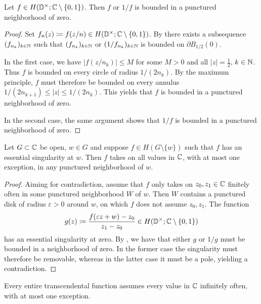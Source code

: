 \begin{lemma} \label{lem:great-picard-bounded}
    Let $f \in H(\mathbb{D}^\times; \mathbb{C} \setminus \{ 0, 1 \})$. Then $f$ or $1/f$ is bounded in a punctured neighborhood of zero.
\end{lemma}

\begin{proof}
    Set $f_n(z) \coloneqq f(z / n) \in H(\mathbb{D}^\times; \mathbb{C} \setminus \{ 0, 1 \})$. By  there exists a subsequence $(f_{n_k})_{k \in \mathbb{N}}$ such that $(f_{n_k})_{k \in \mathbb{N}}$ or $(1 / f_{n_k})_{k \in \mathbb{N}}$ is bounded on $\partial B_{1/2}(0)$.

    In the first case, we have $\vert f(z / n_k) \vert \leq M$ for some $M > 0$ and all $\vert z \vert = \frac{1}{2}$, $k \in \mathbb{N}$. Thus $f$ is bounded on every circle of radius $1 / (2 n_k)$. By the maximum principle, $f$ must therefore be bounded on every annulus $1 / (2 n_{k + 1}) \leq \vert z \vert \leq 1 / (2 n_k)$. This yields that $f$ is bounded in a punctured neighborhood of zero.

    In the second case, the same argument shows that $1 / f$ is bounded in a punctured neighborhood of zero.
\end{proof}

\begin{theorem} \label{thm:picards-great-theorem}
    Let $G \subset \mathbb{C}$ be open, $w \in G$ and suppose $f \in H(G \setminus \{ w \})$ such that $f$ has an essential singularity at $w$. Then $f$ takes on all values in $\mathbb{C}$, with at most one exception, in any punctured neighborhood of $w$.
\end{theorem}

\begin{proof}
    Aiming for contradiction, assume that $f$ only takes on $z_0, z_1 \in \mathbb{C}$ finitely often in some punctured neighborhood $W$ of $w$. Then $W$ contains a punctured disk of radius $\varepsilon > 0$ around $w$, on which $f$ does not assume $z_0, z_1$. The function
    $$ g(z) \coloneqq \frac{f(\varepsilon z + w) - z_0}{z_1 - z_0} \in H(\mathbb{D}^\times; \mathbb{C} \setminus \{ 0, 1 \}) $$
    has an essential singularity at zero. By , we have that either $g$ or $1/g$ must be bounded in a neighborhood of zero. In the former case the singularity must therefore be removable, whereas in the latter case it must be a pole, yielding a contradiction.
\end{proof}

\begin{corollary} \label{cor:transcendental-every-value-inf}
    Every entire transcendental function assumes every value in $\mathbb{C}$ infinitely often, with at most one exception.
\end{corollary}

